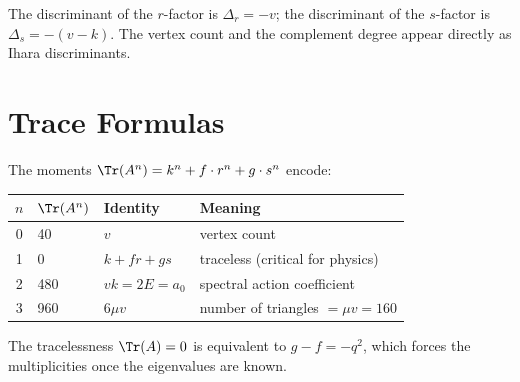 \begin{corollary}
The discriminant of the $r$-factor is $\Delta_r = -v$;
the discriminant of the $s$-factor is $\Delta_s = -(v{-}k)$.
The vertex count and the complement degree appear directly
as Ihara discriminants.
\end{corollary}

\section{Trace Formulas}

The moments $\Tr(A^n) = k^n + f\cdot r^n + g\cdot s^n$ encode:
\begin{center}
\begin{tabular}{@{}clll@{}}
\toprule
$n$ & $\Tr(A^n)$ & Identity & Meaning \\
\midrule
0 & 40 & $v$ & vertex count \\
1 & 0 & $k+fr+gs$ & traceless (critical for physics) \\
2 & 480 & $vk = 2E = a_0$ & spectral action coefficient \\
3 & 960 & $6\mu v$ & number of triangles $= \mu v = 160$ \\
\bottomrule
\end{tabular}
\end{center}
The tracelessness $\Tr(A)=0$ is equivalent to $g-f = -q^2$, which
forces the multiplicities once the eigenvalues are known.
